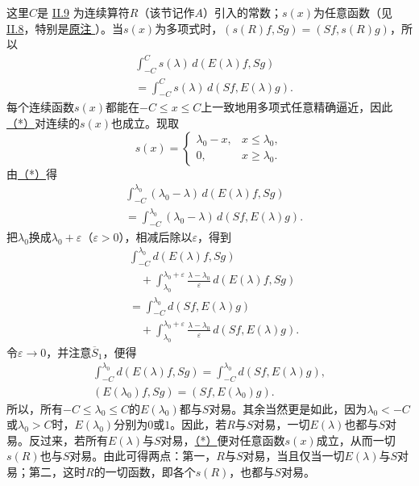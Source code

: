 \documentclass[fontsize=13pt,twoside,openany,headings=normal,parskip=false,bookmarkpackage=false,DIV=calc]{scrbook}
\begin{document}
\hypertarget{origpage-89}{}\label{origpage-89}这里$C$是 \hyperref[sec:II.9]{II.9} 为连续算符$R$（该节记作$A$）引入的常数；$s(x)$为任意函数（见 \hyperref[sec:II.8]{II.8}，特别是\CJKglue \hyperlink{note-94}{原注 }）。当$s(x)$为多项式时，$(s(R)f,\allowbreak Sg)=(Sf,\allowbreak s(R)g)$，所以
\begin{equation}
\begin{aligned}
&\int_{-C}^Cs(\lambda)\,d(E(\lambda)f,Sg)\\
&=\int_{-C}^Cs(\lambda)\,d(Sf,E(\lambda)g).
\end{aligned}
\tag{*}\label{eq:II.10.star}
\end{equation}
每个连续函数$s(x)$都能在$-C\leq x\leq C$上一致地用多项式任意精确逼近，因此\CJKglue \hyperref[eq:II.10.star]{（*）}\CJKglue 对连续的$s(x)$也成立。现取
\[
s(x)=\begin{cases}\lambda_0-x,&x\leq\lambda_0,\\0,&x\geq\lambda_0.\end{cases}
\]
由\CJKglue \hyperref[eq:II.10.star]{（*）}\CJKglue 得
\begin{align*}
&\int_{-C}^{\lambda_0}(\lambda_0-\lambda)\,d(E(\lambda)f,Sg)\\
&=\int_{-C}^{\lambda_0}(\lambda_0-\lambda)\,d(Sf,E(\lambda)g).
\end{align*}
把$\lambda_0$换成$\lambda_0+\varepsilon$（$\varepsilon>0$），相减后除以$\varepsilon$，得到
\begin{align*}
&\int_{-C}^{\lambda_0}d(E(\lambda)f,Sg)\\
&\quad+\int_{\lambda_0}^{\lambda_0+\varepsilon}\frac{\lambda-\lambda_0}{\varepsilon}\,d(E(\lambda)f,Sg)\\
&=\int_{-C}^{\lambda_0}d(Sf,E(\lambda)g)\\
&\quad+\int_{\lambda_0}^{\lambda_0+\varepsilon}\frac{\lambda-\lambda_0}{\varepsilon}\,d(Sf,E(\lambda)g).
\end{align*}
令$\varepsilon\to0$，并注意$\hyperref[cond:II.Sbar1]{\overline S_1}$，便得
\begin{gather*}
\int_{-C}^{\lambda_0}d(E(\lambda)f,Sg)=\int_{-C}^{\lambda_0}d(Sf,E(\lambda)g),\\
(E(\lambda_0)f,Sg)=(Sf,E(\lambda_0)g).
\end{gather*}
所以，所有$-C\leq\lambda_0\leq C$的$E(\lambda_0)$都与$S$对易。其余当然更是如此，因为$\lambda_0<-C$或$\lambda_0>C$时，$E(\lambda_0)$分别为$0$或$1$。因此，若$R$与$S$对易，一切$E(\lambda)$也都与$S$对易。反过来，若所有$E(\lambda)$与$S$对易，\hyperref[eq:II.10.star]{（*）}\CJKglue 便对任意函数$s(x)$成立，从而一切$s(R)$也与$S$对易。由此可得两点：第一，$R$与$S$对易，当且仅当一切$E(\lambda)$与$S$对易；第二，这时$R$的一切函数，即各个$s(R)$，也都与$S$对易。
\end{document}
